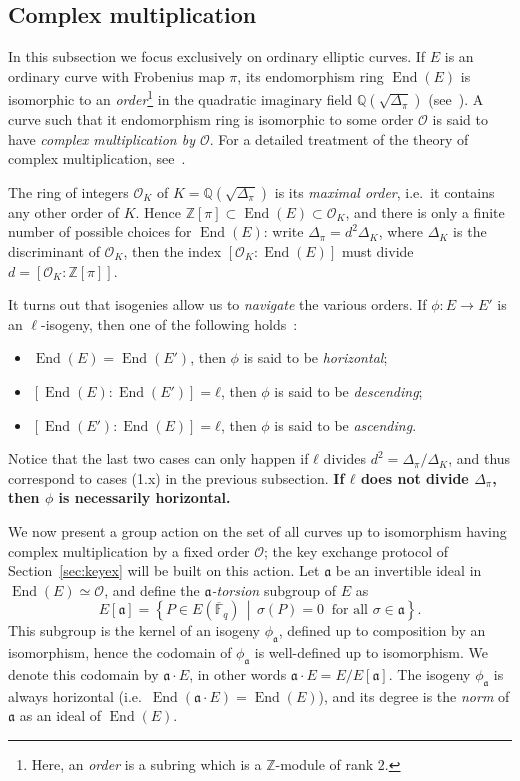 \documentclass{llncs}
\newcommand{\Fbar}{\overline{\mathbb{F}}}
\renewcommand{\O}{\mathcal{O}}
\newcommand{\set}[1]{\left\{#1\right\}}
\newcommand{\suchthat}{\,\middle\vert\,}
\renewcommand{\frak}{\mathfrak}
\DeclareMathOperator{\End}{End}
\begin{document}
\subsection{Complex multiplication}

In this subsection we focus exclusively on ordinary elliptic
curves. If $E$ is an ordinary curve with Frobenius map $π$, its
endomorphism ring $\End(E)$ is isomorphic to an
\emph{order}\footnote{Here, an \emph{order} is a subring which is a
  $ℤ$-module of rank $2$.} in the quadratic imaginary field
$ℚ(\sqrt{Δ_π})$ (see~\cite[III.9]{silverman:elliptic}).  A curve such
that it endomorphism ring is isomorphic to some order $\O$ is said to
have \emph{complex multiplication by $\O$}.  For a detailed treatment
of the theory of complex multiplication,
see~\cite{lang1987elliptic,silverman:advanced}.

The ring of integers $\O_K$ of $K=ℚ(\sqrt{Δ_π})$ is its
\emph{maximal order}, i.e.\ it contains any other order of $K$.  Hence
$ℤ[π]⊂\End(E)⊂\O_K$, and there is only a finite number of possible
choices for $\End(E)$: write $Δ_π=d^2Δ_K$, where $Δ_K$ is the
discriminant of $\O_K$, then the index $[\O_K:\End(E)]$ must divide
$d=[\O_K:ℤ[π]]$.

It turns out that isogenies allow us to \emph{navigate} the various
orders. If $ϕ:E→E'$ is an $\ell$-isogeny, then one of the following
holds~\cite[Prop.~21]{kohel}:
\begin{itemize}
\item $\End(E) = \End(E')$, then $ϕ$ is said to be
  \emph{horizontal};
\item $[\End(E):\End(E')] = ℓ$, then $ϕ$ is said to be
  \emph{descending};
\item $[\End(E'):\End(E)] = ℓ$, then $ϕ$ is said to be
  \emph{ascending}.
\end{itemize}
Notice that the last two cases can only happen if $ℓ$ divides
$d^2=Δ_π/Δ_K$, and thus correspond to cases (1.x) in the previous
subsection.
\textbf{If $ℓ$ does not divide $Δ_π$, then $ϕ$ is necessarily
  horizontal.}

We now present a group action on the set of all curves 
up to isomorphism having complex
multiplication by a fixed order $\O$; the key exchange protocol of
Section~\ref{sec:keyex} will be built on this action. Let $\frak a$ be
an invertible ideal in $\End(E)≃\O$, and define the
\emph{${\frak a}$-torsion} subgroup of $E$ as
\[
E[\frak a] = \set{P\in E(\Fbar_q) \suchthat σ(P) = 0\ 
\text{ for all }σ\in\frak a}.
\]
This subgroup is the kernel of an isogeny $\phi_{\frak a}$, defined up
to composition by an isomorphism, hence the codomain of
$\phi_{\frak a}$ is well-defined up to isomorphism.  We denote this
codomain by $\frak a\cdot E$, in other words
$\frak a\cdot E = E/E[\frak a]$.  The isogeny $\phi_{\frak a}$ is
always horizontal (i.e.\ $\End(\frak a \cdot E) = \End(E)$), and its
degree is the \emph{norm} of $\frak a$ as an ideal of $\End(E)$.
\end{document}
